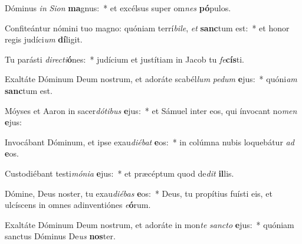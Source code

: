 \item Dóminus \textit{in} \textit{Si}\textit{on} \textbf{ma}gnus:~* et excélsus super om\textit{nes} \textbf{pó}pulos.
\item Confiteántur nómini tuo magno: quóniam terrí\textit{bi}\textit{le}, \textit{et} \textbf{sanc}tum est:~* et honor regis judíci\textit{um} \textbf{dí}ligit.
\item Tu parásti \textit{di}\textit{rec}\textit{ti}\textbf{ó}nes:~* judícium et justítiam in Jacob tu \textit{fe}\textbf{cís}ti.
\item Exaltáte Dóminum Deum nostrum, et adoráte scabél\textit{lum} \textit{pe}\textit{dum} \textbf{e}jus:~* quóni\textit{am} \textbf{sanc}tum est.
\item Móyses et Aaron in sacer\textit{dó}\textit{ti}\textit{bus} \textbf{e}jus:~* et Sámuel inter eos, qui ínvocant no\textit{men} \textbf{e}jus:
\item Invocábant Dóminum, et ipse exau\textit{di}\textit{é}\textit{bat} \textbf{e}os:~* in colúmna nubis loquebátur \textit{ad} \textbf{e}os.
\item Custodiébant testi\textit{mó}\textit{ni}\textit{a} \textbf{e}jus:~* et præcéptum quod de\textit{dit} \textbf{il}lis.
\item Dómine, Deus noster, tu exau\textit{di}\textit{é}\textit{bas} \textbf{e}os:~* Deus, tu propítius fuísti eis, et ulcíscens in omnes adinventiónes \textit{e}\textbf{ó}rum.
\item Exaltáte Dóminum Deum nostrum, et adoráte in mon\textit{te} \textit{sanc}\textit{to} \textbf{e}jus:~* quóniam sanctus Dóminus De\textit{us} \textbf{nos}ter.

